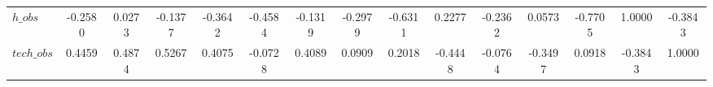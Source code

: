 \begin{center}
\begin{longtable}{lcccccccccccccc}
$h\_obs         $	 & 	          -0.2580	 & 	           0.0273	 & 	          -0.1377	 & 	          -0.3642	 & 	          -0.4584	 & 	          -0.1319	 & 	          -0.2979	 & 	          -0.6311	 & 	           0.2277	 & 	          -0.2362	 & 	           0.0573	 & 	          -0.7705	 & 	           1.0000	 & 	          -0.3843 \\ 
$tech\_obs      $	 & 	           0.4459	 & 	           0.4874	 & 	           0.5267	 & 	           0.4075	 & 	          -0.0728	 & 	           0.4089	 & 	           0.0909	 & 	           0.2018	 & 	          -0.4448	 & 	          -0.0764	 & 	          -0.3497	 & 	           0.0918	 & 	          -0.3843	 & 	           1.0000 \\ 
\end{longtable}
 \end{center}

